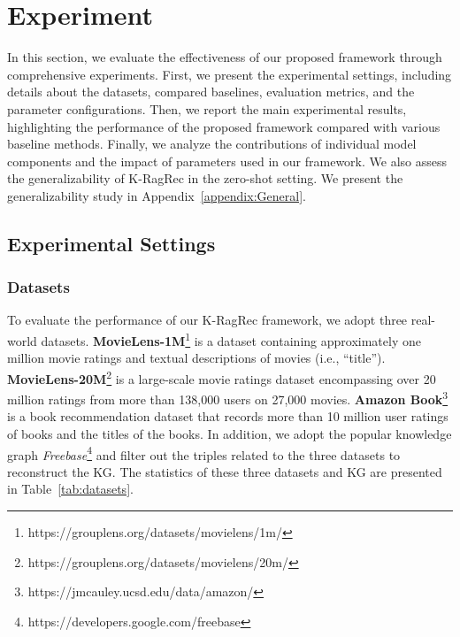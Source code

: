 \section{Experiment}
In this section, we evaluate the effectiveness of our proposed framework through comprehensive experiments. 
First, we present the experimental settings, including details about the datasets, compared baselines, evaluation metrics, and the parameter configurations. Then, we report the main experimental results, highlighting the performance of the proposed framework compared with various baseline methods.
Finally, we analyze the contributions of individual model components and the impact of parameters used in our framework. We also assess the generalizability of K-RagRec in the zero-shot setting. We present the generalizability study in Appendix~\ref{appendix:General}.



\subsection{\textbf{Experimental Settings}}
\subsubsection{\textbf{Datasets}}\label{datasets}
To evaluate the performance of our K-RagRec framework, we adopt three real-world datasets.
\textbf{MovieLens-1M}\footnote{https://grouplens.org/datasets/movielens/1m/} is a dataset containing approximately one million movie ratings and textual descriptions of movies (i.e., “title”). 
\textbf{MovieLens-20M}\footnote{https://grouplens.org/datasets/movielens/20m/} is a large-scale movie ratings dataset encompassing over 20 million ratings from more than 138,000 users on 27,000 movies.
\textbf{Amazon Book}\footnote{https://jmcauley.ucsd.edu/data/amazon/} is a book recommendation dataset that records more than 10 million user ratings of books and the titles of the books.
In addition, we adopt the popular knowledge graph \textit{Freebase}\footnote{https://developers.google.com/freebase} and filter out the triples related to the three datasets to reconstruct the KG. The statistics of these three datasets and KG are presented in Table~\ref{tab:datasets}. 









